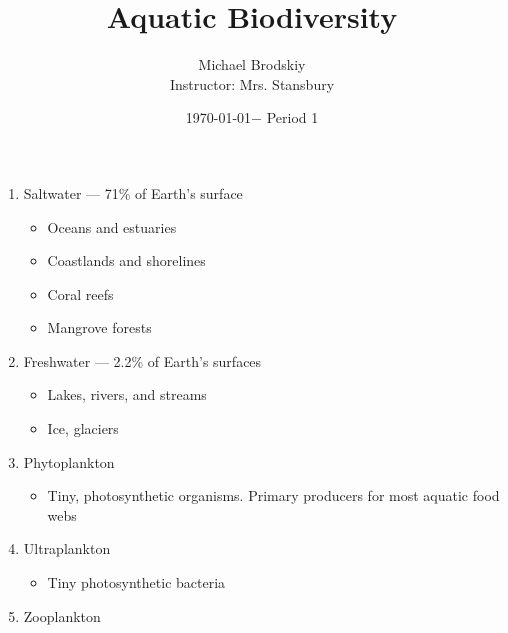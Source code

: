 \documentclass[12pt]{article}
\title{Aquatic Biodiversity}
\date{\today $-$ Period 1}
\author{Michael Brodskiy\\ \small Instructor: Mrs. Stansbury}
\begin{document}
\maketitle

\begin{enumerate}

  \item Saltwater — 71\% of Earth's surface

    \begin{itemize}

      \item Oceans and estuaries

      \item Coastlands and shorelines

      \item Coral reefs

      \item Mangrove forests
        
    \end{itemize}

  \item Freshwater — 2.2\% of Earth's surfaces

    \begin{itemize}

      \item Lakes, rivers, and streams

      \item Ice, glaciers

    \end{itemize}

  \item Phytoplankton

    \begin{itemize}

      \item Tiny, photosynthetic organisms. Primary producers for most aquatic food webs

    \end{itemize}

  \item Ultraplankton

    \begin{itemize}

      \item Tiny photosynthetic bacteria

    \end{itemize}

  \item Zooplankton


\end{enumerate}
\end{document}
